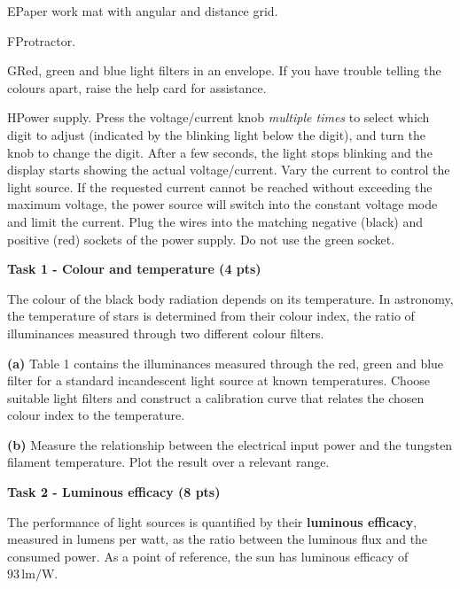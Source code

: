 E\quad Paper work mat with angular and distance grid.

F\quad Protractor.

G\quad Red, green and blue light filters in an envelope. If you have trouble
telling the colours apart, raise the help card for assistance.

\noindent{}

H\quad Power supply. Press the voltage/current knob \textit{multiple times} to
select which digit to adjust (indicated by the blinking light below the digit),
and turn the knob to change the digit. After a few seconds, the light stops
blinking and the display starts showing the actual voltage/current. Vary the
current to control the light source. If the requested current cannot be reached
without exceeding the maximum voltage, the power source will switch into the
constant voltage mode and limit the current. Plug the wires into the matching
negative (black) and positive (red) sockets of the power supply. Do not use the
green socket.

\noindent{}

\textbf{Task 1 - Colour and temperature (4 pts)}

The colour of the black body radiation depends on its temperature. In
astronomy, the temperature of stars is determined from their colour index, the
ratio of illuminances measured through two different colour filters.

\textbf{(a)} Table 1 contains the illuminances measured through the red, green
and blue filter for a standard incandescent light source at known temperatures.
Choose suitable light filters and construct a calibration curve that relates
the chosen colour index to the temperature.

\textbf{(b)} Measure the relationship between the electrical input power and
the tungsten filament temperature. Plot the result over a relevant range.

\textbf{Task 2 - Luminous efficacy (8 pts)}

The performance of light sources is quantified by their \textbf{luminous
efficacy}, measured in lumens per watt, as the ratio between the luminous flux
and the consumed power. As a point of reference, the sun has luminous efficacy
of $93\,\mathrm{lm/W}$.

